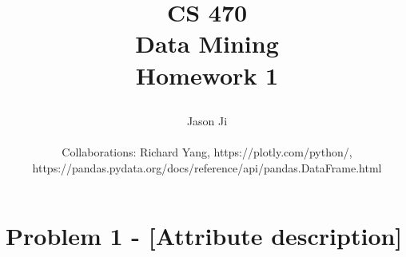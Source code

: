 \documentclass[9pt,twoside]{exam}
\begin{document}
\title{\begin{tcolorbox} \begin{center}{CS 470\\ 
\vspace{0.5cm}
Data Mining\\
\vspace{0.5cm}
Homework 1\\
 } \end{center}
 \end{tcolorbox}}
 \author{ 
 Jason Ji \\\\
Collaborations: Richard Yang, https://plotly.com/python/, \\https://pandas.pydata.org/docs/reference/api/pandas.DataFrame.html}
 \date{  }
 \maketitle
\pagestyle{myheadings}
\thispagestyle{plain}
\vspace{-0.5cm}







\newcommand{\bi}{\mathbf{i}}
\newcommand{\bbb}{\mathbf{b}}



\section*{Problem 1 -  [Attribute description]}
\end{document}
